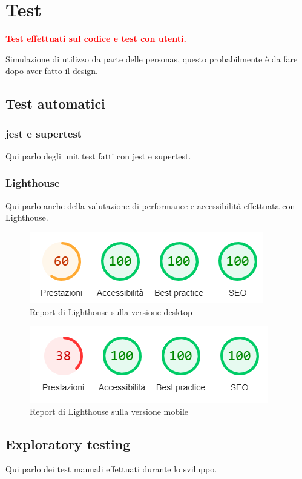 \documentclass{article}
\begin{document}
\section{Test}
\textcolor{red}{\textbf{Test effettuati sul codice e test con utenti.}}

Simulazione di utilizzo da parte delle personas, questo probabilmente è da fare dopo aver fatto il design.

\subsection{Test automatici}
\subsubsection{jest e supertest}
Qui parlo degli unit test fatti con jest e supertest.
\subsubsection{Lighthouse}
Qui parlo anche della valutazione di performance e accessibilità effettuata con Lighthouse.
\begin{figure}
	\centering
	\includegraphics[scale=1]{lighthouse_report_desktop}
	\caption{Report di Lighthouse sulla versione desktop}
	\label{fig:lighthouse_report_desktop}
\end{figure}
\begin{figure}
	\centering
	\includegraphics[scale=1]{lighthouse_report_mobile}
	\caption{Report di Lighthouse sulla versione mobile}
	\label{fig:lighthouse_report_mobile}
\end{figure}

\subsection{Exploratory testing}
Qui parlo dei test manuali effettuati durante lo sviluppo.
\end{document}

